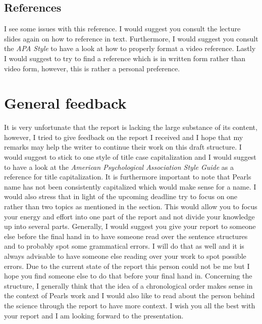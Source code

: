 \documentclass{article}
\begin{document}
\subsection{References}
I see some issues with this reference. I would suggest you consult the lecture slides again on how to reference in text. Furthermore, I would suggest you consult the \textit{APA Style} to have a look at how to properly format a video reference. Lastly I would suggest to try to find a reference which is in written form rather than video form, however, this is rather a personal preference.

\section{General feedback}
\label{general}

It is very unfortunate that the report is lacking the large substance of its content, however, I tried to give feedback on the report I received and I hope that my remarks may help the writer to continue their work on this draft structure.
I would suggest to stick to one style of title case capitalization and I would suggest to have a look at the \textit{American Psychological Association Style Guide} as a reference for title capitalization.
It is furthermore important to note that Pearls name has not been consistently capitalized which would make sense for a name.
I would also stress that in light of the upcoming deadline try to focus on one rather than two topics as mentioned in the  section. This would allow you to focus your energy and effort into one part of the report and not divide your knowledge up into several parts.
Generally, I would suggest you give your report to someone else before the final hand in to have someone read over the sentence structures and to probably spot some grammatical errors. I will do that as well and it is always advisable to have someone else reading over your work to spot possible errors. Due to the current state of the report this person could not be me but I hope you find someone else to do that before your final hand in.
Concerning the structure, I generally think that the idea of a chronological order makes sense in the context of Pearls work and I would also like to read about the person behind the science through the report to have more context.
I wish you all the best with your report and I am looking forward to the presentation. 
\end{document}
